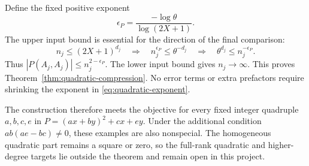 Define the fixed positive exponent
\begin{equation}
\epsilon_P=\frac{-\log\theta}{\log(2X+1)}.
\label{eq:quadratic-exponent}
\end{equation}
The upper input bound is essential for the direction of the final comparison:
\[
n_j\le(2X+1)^{d_j}
\quad\Longrightarrow\quad
n_j^{\epsilon_P}\le\theta^{-d_j}
\quad\Longrightarrow\quad
\theta^{d_j}\le n_j^{-\epsilon_P}.
\]
Thus $|P(A_j,A_j)|\le n_j^{2-\epsilon_P}$. The lower input bound gives $n_j\to\infty$. This proves Theorem~\ref{thm:quadratic-compression}. No error terms or extra prefactors require shrinking the exponent in \eqref{eq:quadratic-exponent}.

The construction therefore meets the objective for every fixed integer quadruple $a,b,c,e$ in $P=(ax+by)^2+cx+ey$. Under the additional condition $ab(ae-bc)\ne0$, these examples are also nonspecial. The homogeneous quadratic part remains a square or zero, so the full-rank quadratic and higher-degree targets lie outside the theorem and remain open in this project.

